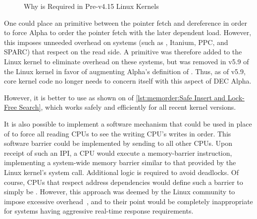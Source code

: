 \begin{figure}
\centering
{}
\caption{Why  is Required in Pre-v4.15 Linux Kernels}
\label{fig:memorder:fig:memorder:Why smp-read-barrier-depends() is Required in Pre-v4.15 Linux Kernels}
\end{figure}

One could place an  primitive
between the pointer fetch and dereference in order to force Alpha
to order the pointer fetch with the later dependent load.
However, this imposes unneeded overhead on systems (such as \ARM,
Itanium, PPC, and SPARC) that respect
 on the read side.
A  primitive was therefore added to the
Linux kernel to eliminate overhead on these systems, but was removed
in v5.9 of the Linux kernel in favor of augmenting Alpha's definition
of .
Thus, as of v5.9, core kernel code no longer needs to concern itself
with this aspect of DEC Alpha.
\begin{fcvref}
However, it is better to use 
as shown on  of
\cref{lst:memorder:Safe Insert and Lock-Free Search},
which works safely and efficiently for all recent kernel versions.
\end{fcvref}

It is also possible to implement a software mechanism
that could be used in place of  to force
all reading CPUs to see the writing CPU's writes in order.
This software barrier could be implemented by sending 
to all other CPUs.
Upon receipt of such an IPI, a CPU would execute a memory-barrier
instruction, implementing a system-wide memory barrier similar to that
provided by the Linux kernel's  system call.
Additional logic is required to avoid deadlocks.
Of course, CPUs that respect address dependencies would define such a barrier
to simply be .
However, this approach was deemed by the Linux community
to impose excessive overhead~\cite{McKenney01f}, and to their point would
be completely inappropriate for systems having
aggressive real-time response requirements.

